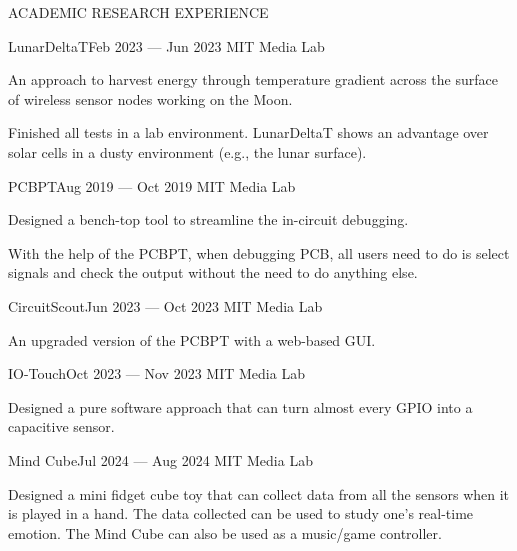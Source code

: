 \documentclass{resume} %
\begin{document}
\begin{rSection}{ACADEMIC RESEARCH EXPERIENCE}
\begin{rSubsection}{LunarDeltaT}{Feb 2023 --- Jun 2023}{ }{MIT Media Lab}
\item An approach to harvest energy through temperature gradient across
      the surface of wireless sensor nodes working on the Moon.
\item Finished all tests in a lab environment.
      LunarDeltaT shows an advantage over solar cells in a dusty environment (e.g., the lunar surface).
\end{rSubsection}

\begin{rSubsection}{PCBPT}{Aug 2019 --- Oct 2019}{ }{MIT Media Lab}
\item Designed a bench-top tool to streamline the in-circuit debugging.
\item With the help of the PCBPT, when debugging PCB, all users need to do is select signals and check the output without the need to do anything else.
\end{rSubsection}

\begin{rSubsection}{CircuitScout}{Jun 2023 --- Oct 2023}{ }{MIT Media Lab}
\item An upgraded version of the PCBPT with a web-based GUI.
\end{rSubsection}

\begin{rSubsection}{IO-Touch}{Oct 2023 --- Nov 2023}{ }{MIT Media Lab}
\item Designed a pure software approach that can turn almost every GPIO into a capacitive sensor.
\end{rSubsection}

\begin{rSubsection}{Mind Cube}{Jul 2024 --- Aug 2024}{ }{MIT Media Lab}
\item Designed a mini fidget cube toy that can collect data from all the sensors when it is
played in a hand. The data collected can be used to study one's real-time emotion.
The Mind Cube can also be used as a music/game controller.
\end{rSubsection}

\end{rSection}
\end{document}
